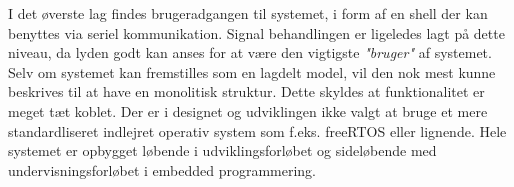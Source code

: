I det øverste lag findes brugeradgangen til systemet, i form af en shell der kan benyttes via seriel kommunikation.
Signal behandlingen er ligeledes lagt på dette niveau, da lyden godt kan anses for at være den vigtigste \textit{"bruger"} af systemet.\\

Selv om systemet kan fremstilles som en lagdelt model, vil den nok mest kunne beskrives til at have en monolitisk struktur.
Dette skyldes at funktionalitet er meget tæt koblet.
Der er i designet og udviklingen ikke valgt at bruge et mere standardliseret indlejret operativ system som f.eks. freeRTOS eller lignende.
Hele systemet er opbygget løbende i udviklingsforløbet og sideløbende med undervisningsforløbet i embedded programmering.  

\FloatBlock